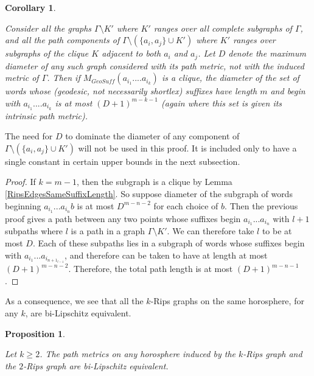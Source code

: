 \documentclass[10pt,a4paper]{amsart}
\newtheorem{corollary}[theorem]{Corollary}
\newtheorem{proposition}[theorem]{Proposition}
\theoremstyle{definition}
\theoremstyle{remark}
\begin{document}
	\begin{corollary} \label{RipsSubgraphDiameterBound}
		
		Consider all the graphs $\Gamma\setminus K'$ where $K'$ ranges over all complete subgraphs of $\Gamma$, and all the path components of $\Gamma\setminus (\{a_i, a_j\}\cup K')$ where $K'$ ranges over subgraphs of the clique $K$ adjacent to both $a_i$ and $a_j$. Let $D$ denote the maximum diameter of any such graph considered with its path metric, not with the induced metric of $\Gamma$. Then if $M_{GeoSuff}(a_{i_1}....a_{i_k})$ is a clique, the diameter of the set of words whose (geodesic, not necessarily shortlex) suffixes have length $m$ and begin with $a_{i_1}....a_{i_k}$ is at most $(D+1)^{m-k-1}$ (again where this set is given its intrinsic path metric).
		
	\end{corollary}
	
	The need for $D$ to dominate the diameter of any component of $\Gamma\setminus (\{a_i, a_j\}\cup K')$ will not be used in this proof. It is included only to have a single constant in certain upper bounds in the next subsection.
	
	\begin{proof}
		
		If $k=m-1$, then the subgraph is a clique by Lemma \ref{RipsEdgesSameSuffixLength}. So suppose diameter of the subgraph of words beginning $a_{i_1}...a_{i_n}b$ is at most $D^{m-n-2}$ for each choice of $b$. Then the previous proof gives a path between any two points whose suffixes begin $a_{i_1}...a_{i_n}$ with $l+1$ subpaths where $l$ is a path in a graph $\Gamma\setminus K'$. We can therefore take $l$ to be at most $D$. Each of these subpaths lies in a subgraph of words whose suffixes begin with $a_{i_1}...a_{i_{n+1_{l-1}}}$, and therefore can be taken to have at length at most $(D+1)^{m-n-2}$. Therefore, the total path length is at most $(D+1)^{m-n-1}$.		
	 \end{proof}
	
	As a consequence, we see that all the $k$-Rips graphs on the same horosphere, for any $k$, are bi-Lipschitz equivalent.
	
	\begin{proposition} \label{RipsGraphBiLipschitzEquivalence}
		
		Let $k\ge 2$. The path metrics on any horosphere induced by the $k$-Rips graph and the $2$-Rips graph are bi-Lipschitz equivalent.
		
	\end{proposition}
	
\end{document}
